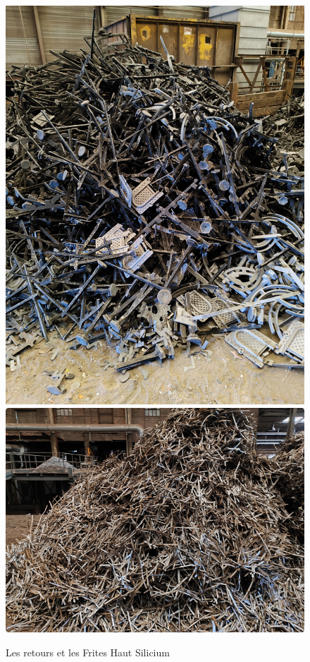\documentclass[12pt]{article}
\begin{document}
\begin{enumerate}
    \begin{figure}[H]
        \centering
        \vfill
        \hspace{0.8 cm}
        \includegraphics[scale=0.7]{Images/Presentation/Les Retours.pdf}
        \hspace{0.5 cm}
        \includegraphics[scale=0.7]{Images/Presentation/Frite Haut Silicium.pdf}
        \caption{Les retours et les Frites Haut Silicium}
    \end{figure}


\end{enumerate}
\end{document}
